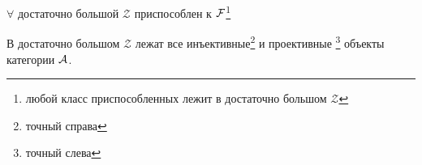 \documentclass[../main.tex]{subfiles}
\begin{document}
\begin{to_claim}
$\forall$ достаточно большой $\mathcal{Z}$ приспособлен к $\mathcal{F}$\footnote{любой класс приспособленных лежит в достаточно большом $\mathcal{Z}$}
\end{to_claim}
\begin{to_claim}
В достаточно большом $\mathcal{Z}$ лежат все инъективные\footnote{точный справа} и проективные \footnote{точный слева} объекты категории $\mathcal{A}$.
\end{to_claim}
\end{document}

